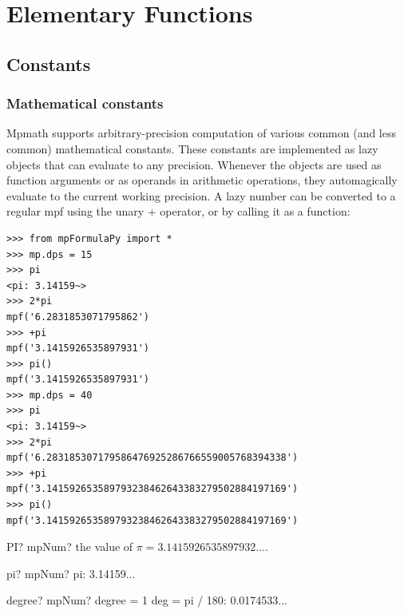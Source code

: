 \chapter{Elementary Functions}
\section{Constants}
\label{Constants}


\subsection{Mathematical constants}
Mpmath supports arbitrary-precision computation of various common (and less common) mathematical constants. These constants are implemented as lazy objects that can evaluate to any precision. Whenever the objects are used as function arguments or as operands in arithmetic operations, they automagically evaluate to the current working precision. A lazy number can be converted to a regular mpf using the unary + operator, or by calling it as a function:

\begin{lstlisting}
>>> from mpFormulaPy import *
>>> mp.dps = 15
>>> pi
<pi: 3.14159~>
>>> 2*pi
mpf('6.2831853071795862')
>>> +pi
mpf('3.1415926535897931')
>>> pi()
mpf('3.1415926535897931')
>>> mp.dps = 40
>>> pi
<pi: 3.14159~>
>>> 2*pi
mpf('6.283185307179586476925286766559005768394338')
>>> +pi
mpf('3.141592653589793238462643383279502884197169')
>>> pi()
mpf('3.141592653589793238462643383279502884197169')
\end{lstlisting}



\vspace{0.6cm}

\begin{mpFunctionsExtract}
	\mpWorksheetFunctionZero
	{PI? mpNum? the value of $\pi = 3.1415926535897932...$.}
\end{mpFunctionsExtract}


\vspace{0.6cm}


\begin{mpFunctionsExtract}
	\mpFunctionZero
	{pi? mpNum?  pi: 3.14159...}
\end{mpFunctionsExtract}


\vspace{0.6cm}

\begin{mpFunctionsExtract}
	\mpFunctionZero
	{degree? mpNum?  degree = 1 deg = pi / 180: 0.0174533...}
\end{mpFunctionsExtract}


